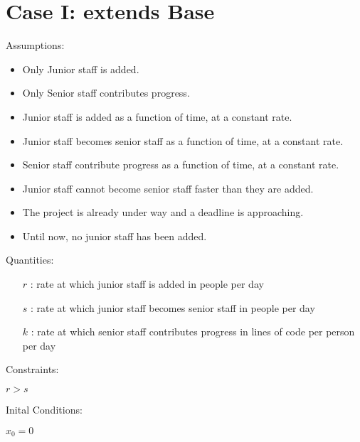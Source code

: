 \documentclass{article}
\newenvironment{atomize}
    {\begin{list} {} {
            \setlength\itemindent{0pt}
            \setlength\leftmargin{10pt}
            \setlength\labelwidth{0pt}
    }}
    {\end{list}}
\begin{document}
\section*{Case I: extends Base}
    \begin{atomize}
        \item Assumptions:
            \begin{itemize}
                \item Only Junior staff is added.
                \item Only Senior staff contributes progress.
				\item Junior staff is added as a function of time, at a constant rate.
				\item Junior staff becomes senior staff as a function of time, at a constant rate.
				\item Senior staff contribute progress as a function of time, at a constant rate.
                \item Junior staff cannot become senior staff faster than they are added.
				\item The project is already under way and a deadline is approaching.
				\item Until now, no junior staff has been added.
            \end{itemize}

        \item Quantities:
            \begin{itemize}
                \item [$r$]: rate at which junior staff is added in people per day
                \item [$s$]: rate at which junior staff becomes senior staff in people per day
                \item [$k$]: rate at which senior staff contributes progress in lines of code per person per day
            \end{itemize}

				\item Constraints:
					\begin{atomize}
						\item $r > s$
					\end{atomize}

				\item Inital Conditions:
					\begin{atomize}
						\item $x_{0} = 0$
					\end{atomize}


\end{atomize}
\end{document}
